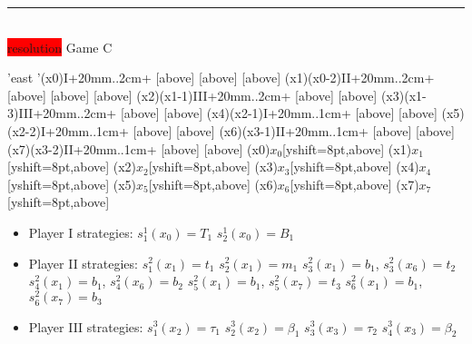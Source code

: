 \documentclass[10pt]{report}
\newenvironment{exercise}[1]
    {\vspace{0.5cm}\hrule\vspace{0.5cm}\noindent\fbox{#1}\\}
    {\vspace{0.5cm}}
\newenvironment{response}
{\vspace{0.2cm}\noindent\colorbox{red}{resolution}}
    {\vspace{0.5cm}}
\begin{document}
\begin{exercise}{3.5}
\begin{response}
		\vspace{0.5cm}
		Game C\\
		\vspace{0.5cm}
		\begin{istgame}[sloped,font=\tiny]
			\setistgrowdirection'{east}
			\setistOvalNodeStyle{.6cm}
			\istrooto'(x0){I}+{20mm}..{2cm}+
			[above]
			[above]
			[above]
			\endist
			\xtShowEndPoints[oval node, minimum size=6pt]
			\xtdistance{20mm}{10mm}
			\istrooto(x1)(x0-2){II}+{20mm}..{2cm}+
			[above]
			[above]
			[above]
			\endist
			\istrooto(x2)(x1-1){III}+{20mm}..{2cm}+
			[above]
			[above]
			\endist
			\istrooto(x3)(x1-3){III}+{20mm}..{2cm}+
			[above]
			[above]
			\endist
			\istrooto(x4)(x2-1){I}+{20mm}..{1cm}+
			[above]
			[above]
			\endist
			\istrooto(x5)(x2-2){I}+{20mm}..{1cm}+
			[above]
			[above]
			\endist
			\istrooto(x6)(x3-1){II}+{20mm}..{1cm}+
			[above]
			[above]
			\endist
			\istrooto(x7)(x3-2){II}+{20mm}..{1cm}+
			[above]
			[above]
			\endist
			\xtOwner(x0){$x_{0}$}[yshift=8pt,above]
			\xtOwner(x1){$x_{1}$}[yshift=8pt,above]
			\xtOwner(x2){$x_{2}$}[yshift=8pt,above]
			\xtOwner(x3){$x_{3}$}[yshift=8pt,above]
			\xtOwner(x4){$x_{4}$}[yshift=8pt,above]
			\xtOwner(x5){$x_{5}$}[yshift=8pt,above]
			\xtOwner(x6){$x_{6}$}[yshift=8pt,above]
			\xtOwner(x7){$x_{7}$}[yshift=8pt,above]
		\end{istgame}

		\begin{itemize}
			\item Player I strategies:
			      \subitem $s_{1}^{1}(x_{0}) = T_{1}$
			      \subitem $s_{2}^{1}(x_{0}) = B_{1}$
			\item Player II strategies:
			      \subitem $s_{1}^{2}(x_{1}) = t_{1}$
			      \subitem $s_{2}^{2}(x_{1}) = m_{1}$
			      \subitem $s_{3}^{2}(x_{1}) = b_{1}$, $s_{3}^{2}(x_{6}) = t_{2}$
			      \subitem $s_{4}^{2}(x_{1}) = b_{1}$, $s_{4}^{2}(x_{6}) = b_{2}$
			      \subitem $s_{5}^{2}(x_{1}) = b_{1}$, $s_{5}^{2}(x_{7}) = t_{3}$
			      \subitem $s_{6}^{2}(x_{1}) = b_{1}$, $s_{6}^{2}(x_{7}) = b_{3}$
			\item Player III strategies:
			      \subitem $s_{1}^{3}(x_{2}) = \tau_{1}$
			      \subitem $s_{2}^{3}(x_{2}) = \beta_{1}$
			      \subitem $s_{3}^{3}(x_{3}) = \tau_{2}$
			      \subitem $s_{4}^{3}(x_{3}) = \beta_{2}$
		\end{itemize}

	\end{response}


\end{exercise}
\end{document}
